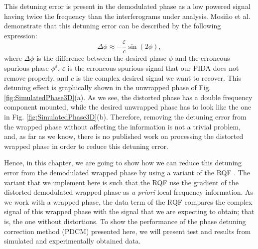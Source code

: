 This detuning error is present in the demodulated phase as a low powered 
signal having twice the frequency than the interferograms under analysis.
Mosi\~no et al. \cite{Mosino:09} demonstrate that this detuning error can be 
described by the following expression: 
\begin{equation}\label{Eq:DetuningError}
	\Delta \phi \approx - \frac{\varepsilon}{c} \sin(2\phi),
\end{equation}
where $\Delta \phi$ is the difference between the desired phase $\phi$ and the 
erroneous spurious phase $\phi^\varepsilon$, $\varepsilon$ is the erroneous 
spurious signal that our PIDA does not remove properly, and $c$ is the complex 
desired signal we want to recover. This detuning effect is graphically shown in 
the unwrapped phase of Fig. \ref{fig:SimulatedPhase3D}(a). As we see, the 
distorted phase has a double frequency component mounted, while the desired 
unwrapped phase has to look like the one in Fig. \ref{fig:SimulatedPhase3D}(b). 
Therefore, removing the detuning error from the wrapped phase without affecting 
the information is not a trivial problem, and, as far as we know, there is no 
published work on processing the distorted wrapped phase in order to reduce 
this detuning error.

Hence, in this chapter, we are going to show how we can reduce this detuning 
error from the demodulated wrapped phase by using a variant of the RQF 
\cite{RQF}. The variant that we implement here is 
such that the RQF use the gradient of the distorted demodulated wrapped 
phase as \emph{a priori} local frequency information. As we work with a 
wrapped phase, the data term of the RQF compares the complex signal of 
this wrapped phase with the signal that we are expecting to obtain; that is, 
the one without distortions.
To show the performance of the phase detuning correction method (PDCM)
presented here, we will present test and results from simulated and 
experimentally obtained data.

